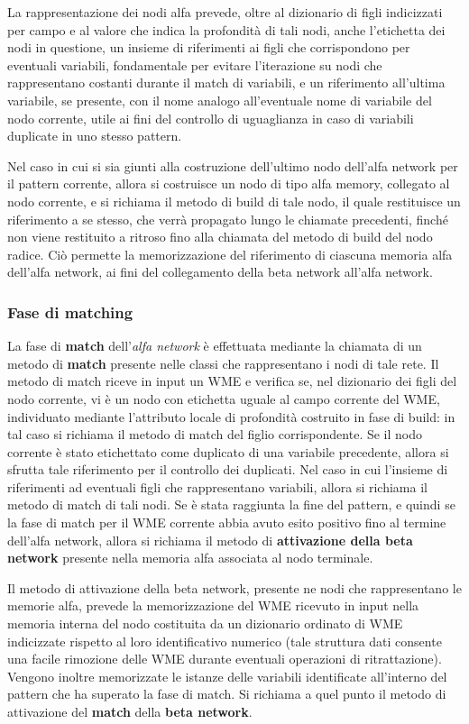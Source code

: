 La rappresentazione dei nodi alfa prevede, oltre al dizionario di figli indicizzati per campo e al valore che indica la profondità di tali nodi, anche l'etichetta dei nodi in questione, un insieme di riferimenti ai figli che corrispondono per eventuali variabili, fondamentale per evitare l'iterazione su nodi che rappresentano costanti durante il match di variabili, e un riferimento all'ultima variabile, se presente, con il nome analogo all'eventuale nome di variabile del nodo corrente, utile ai fini del controllo di uguaglianza in caso di variabili duplicate in uno stesso pattern.

Nel caso in cui si sia giunti alla costruzione dell'ultimo nodo dell'alfa network per il pattern corrente, allora si costruisce un nodo di tipo alfa memory, collegato al nodo corrente, e si richiama il metodo di build di tale nodo, il quale restituisce un riferimento a se stesso, che verrà propagato lungo le chiamate precedenti, finché non viene restituito a ritroso fino alla chiamata del metodo di build del nodo radice. Ciò permette la memorizzazione del riferimento di ciascuna memoria alfa dell'alfa network, ai fini del collegamento della beta network all'alfa network.

\subsubsection{Fase di matching}
La fase di \textbf{match} dell'\emph{alfa network} è effettuata mediante la chiamata di un metodo di \textbf{match} presente nelle classi che rappresentano i nodi di tale rete. Il metodo di match riceve in input un WME e verifica se, nel dizionario dei figli del nodo corrente, vi è un nodo con etichetta uguale al campo corrente del WME, individuato mediante l'attributo locale di profondità costruito in fase di build: in tal caso si richiama il metodo di match del figlio corrispondente. Se il nodo corrente è stato etichettato come duplicato di una variabile precedente, allora si sfrutta tale riferimento per il controllo dei duplicati. Nel caso in cui l'insieme di riferimenti ad eventuali figli che rappresentano variabili, allora si richiama il metodo di match di tali nodi. Se è stata raggiunta la fine del pattern, e quindi se la fase di match per il WME corrente abbia avuto esito positivo fino al termine dell'alfa network, allora si richiama il metodo di \textbf{attivazione della beta network} presente nella memoria alfa associata al nodo terminale.

Il metodo di attivazione della beta network, presente ne nodi che rappresentano le memorie alfa, prevede la memorizzazione del WME ricevuto in input nella memoria interna del nodo costituita da un dizionario ordinato di WME indicizzate rispetto al loro identificativo numerico (tale struttura dati consente una facile rimozione delle WME durante eventuali operazioni di ritrattazione). Vengono inoltre memorizzate le istanze delle variabili identificate all'interno del pattern che ha superato la fase di match. Si richiama a quel punto il metodo di attivazione del \textbf{match} della \textbf{beta network}.

